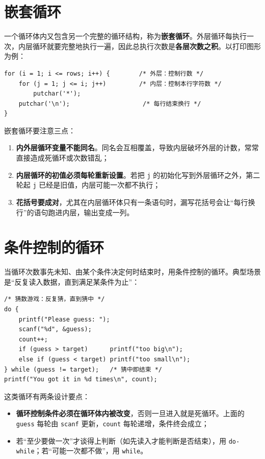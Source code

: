 \section{嵌套循环}

一个循环体内又包含另一个完整的循环结构，称为\textbf{嵌套循环}。外层循环每执行一次，内层循环就要完整地执行一遍，因此总执行次数是\textbf{各层次数之积}。以打印图形为例：

\begin{lstlisting}
for (i = 1; i <= rows; i++) {        /* 外层：控制行数 */
    for (j = 1; j <= i; j++)         /* 内层：控制本行字符数 */
        putchar('*');
    putchar('\n');                    /* 每行结束换行 */
}
\end{lstlisting}

嵌套循环要注意三点：

\begin{enumerate}
  \item \textbf{内外层循环变量不能同名}。同名会互相覆盖，导致内层破坏外层的计数，常常直接造成死循环或次数错乱；
  \item \textbf{内层循环的初值必须每轮重新设置}。若把 \texttt{j} 的初始化写到外层循环之外，第二轮起 \texttt{j} 已经是旧值，内层可能一次都不执行；
  \item \textbf{花括号要成对}，尤其在内层循环体只有一条语句时，漏写花括号会让“每行换行”的语句跑进内层，输出变成一列。
\end{enumerate}

\section{条件控制的循环}

当循环次数事先未知、由某个条件决定何时结束时，用条件控制的循环。典型场景是“反复读入数据，直到满足某条件为止”：

\begin{lstlisting}
/* 猜数游戏：反复猜，直到猜中 */
do {
    printf("Please guess: ");
    scanf("%d", &guess);
    count++;
    if (guess > target)      printf("too big\n");
    else if (guess < target) printf("too small\n");
} while (guess != target);   /* 猜中即结束 */
printf("You got it in %d times\n", count);
\end{lstlisting}

这类循环有两条设计要点：

\begin{itemize}
  \item \textbf{循环控制条件必须在循环体内被改变}，否则一旦进入就是死循环。上面的 \texttt{guess} 每轮由 \texttt{scanf} 更新，\texttt{count} 每轮递增，条件终会成立；
  \item 若“至少要做一次”才谈得上判断（如先读入才能判断是否结束），用 \texttt{do-while}；若“可能一次都不做”，用 \texttt{while}。
\end{itemize}

